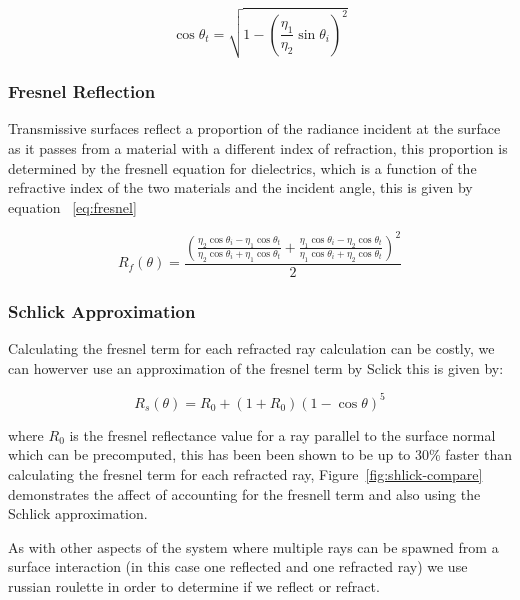\begin{equation}
\cos{\theta_t} = \sqrt{1 - \left(\frac{\eta_1}{\eta_2}\sin{\theta_i}\right)^2}
\end{equation}

\subsubsection{Fresnel Reflection}
Transmissive surfaces reflect a proportion of the radiance incident at the surface as it passes from a material with a different
index of refraction, this proportion is determined by the fresnell equation for dielectrics, which is a function of the refractive
index of the two materials and the incident angle, this is given by equation ~\ref{eq:fresnel}

\begin{equation}
R_f(\theta)
=
\frac{
	\left(
	\frac
	{
	\eta_2 \cos{\theta_i} - \eta_1 \cos{\theta_t}
	}
	{
	\eta_2 \cos{\theta_i} + \eta_1 \cos{\theta_t}
	}
	+
	\frac
	{
	\eta_1 \cos{\theta_i} - \eta_2 \cos{\theta_t}
	}
	{
	\eta_1 \cos{\theta_i} + \eta_2 \cos{\theta_t}
	}
\right)^2
}{2}
\label{eq:fresnel}
\end{equation}

\subsubsection{Schlick Approximation}
Calculating the fresnel term for each refracted ray calculation can be costly, we can howerver use an approximation of the fresnel term
by Sclick this is given by:

\begin{equation}
R_s(\theta)=R_0 + \left(1 + R_0\right)\left(1 - \cos\theta\right)^5
\label{eq:schlick}
\end{equation}

where $R_0$ is the fresnel reflectance value for a ray parallel to the surface normal which can be precomputed,
this has been been shown to be up to 30\% faster than calculating the fresnel term for each refracted ray, Figure~\ref{fig:shlick-compare}
demonstrates the affect of accounting for the fresnell term and also using the Schlick approximation.

As with other aspects of the system where multiple rays can be spawned from a surface interaction (in this case one reflected and one refracted ray)
we use russian roulette in order to determine if we reflect or refract.

